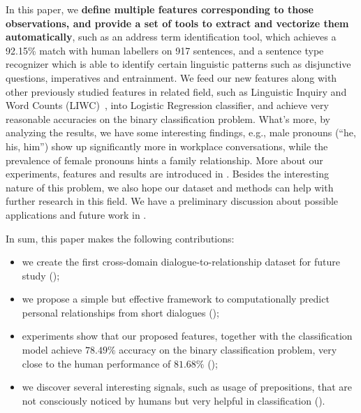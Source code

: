 In this paper, we \textbf{define multiple features corresponding to 
those observations, and provide a set of tools to extract and vectorize them 
automatically}, such as an address term identification tool, 
which achieves a 92.15\% match with human labellers on 
917 sentences, and a sentence type recognizer which is able to 
identify certain linguistic patterns such as disjunctive questions, 
imperatives and entrainment. We feed our new features along with 
other previously studied features in related field,  
such as Linguistic Inquiry and Word Counts (LIWC)~\cite{liwc}, into 
Logistic Regression classifier, and achieve very reasonable accuracies on 
the binary classification problem. 
What's more, by analyzing the results, we have some interesting 
findings, e.g., male pronouns (``he, his, him'') show up significantly more 
in workplace conversations, while the prevalence of female pronouns 
hints a family relationship. More about our experiments, features and 
results are introduced in . 
Besides the interesting nature of this problem, 
we also hope our dataset and methods can help with further research 
in this field. We have a preliminary discussion about possible 
applications and future work in .

In sum, this paper makes the following contributions:
\begin{itemize}
\item we create the first cross-domain dialogue-to-relationship dataset 
for future study ();
\item we propose a simple but effective framework to computationally predict
personal relationships from short dialogues ();
\item experiments show that our proposed features, together with the 
classification model achieve $78.49\%$ accuracy on the binary classification
problem, very close to the human performance of $81.68\%$ ();
\item we discover several interesting signals, 
such as usage of prepositions, that are not consciously noticed 
by humans but very helpful in classification ().
\end{itemize}

